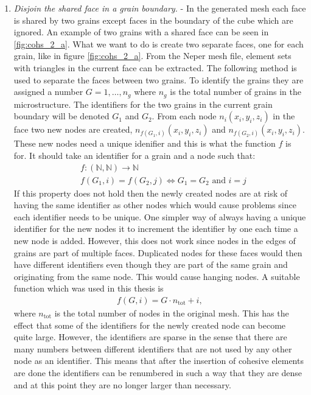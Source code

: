 \documentclass[grain_boundary_law.tex]{subfiles}
\begin{document}
\begin{enumerate}
\item \textit{Disjoin the shared face in a grain boundary.} - In the generated mesh each face is shared by two grains except faces in the boundary of the cube which are ignored. An example of two grains with a shared face can be seen in \ref{fig:cohs_2_a}. What we want to do is create two separate faces, one for each grain, like in figure \ref{fig:cohs_2_a}. From the Neper mesh file, element sets with triangles in the current face can be extracted. The following method is used to separate the faces between two grains. To identify the grains they are assigned a number $G = 1,\ldots , n_g$ where $n_g$ is the total number of grains in the microstructure. The identifiers for the two grains in the current grain boundary will be denoted $G_1$ and $G_2$. From each node $n_i (x_i, y_i, z_i)$ in the face two new nodes are created, $n_{f(G_1,i)} (x_i, y_i, z_i)$ and $n_{f(G_2,i)} (x_i, y_i, z_i)$. These new nodes need a unique idenifier and this is what the function $f$ is for. It should take an identifier for a grain and a node such that:
%
\begin{align}&  f: (\mathbb{N},\mathbb{N}) \rightarrow \mathbb{N} \\
 & f(G_1, i) = f(G_2, j) \Leftrightarrow G_1 = G_2 \text{ and }  i = j  
\end{align}
%
If this property does not hold then the newly created nodes are at risk of having the same identifier as other nodes which would cause problems since each identifier needs to be unique. One simpler way of always having a unique identifier for the new nodes it to increment the identifier by one each time a new node is added. However, this does not work since nodes in the edges of grains are part of multiple faces. Duplicated nodes for these faces would then have different identifiers even though they are part of the same grain and originating from the same node. This would cause hanging nodes. A suitable function which was used in this thesis is
%
\begin{align} 
  f(G, i) = G \cdot n_\text{tot} + i,
\end{align}
%
where $n_\text{tot}$ is the total number of nodes in the original mesh. This has the effect that some of the identifiers for the newly created node can become quite large. However, the identifiers are sparse in the sense that there are many numbers between different identifiers that are not used by any other node as an identifier. This means that after the insertion of cohesive elements are done the identifiers can be renumbered in such a way that they are dense and at this point they are no longer larger than necessary.


\end{enumerate}
\end{document}
